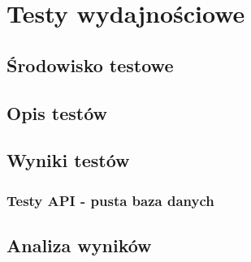 \chapter{Testy wydajnościowe}
\section{Środowisko testowe}
\section{Opis testów}
\section{Wyniki testów}

\subsection{Testy API - pusta baza danych}

\clearpage

% 

% 
% 


\newpage
\section{Analiza wyników}
